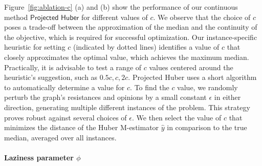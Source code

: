 \label{sec:find-c}




 

Figure~\ref{fig:ablation-c} (a) and (b) show
the performance of our continuous
method $\textsf{Projected Huber}$ for
different values of $c$.
We observe that the choice
of $c$ poses a trade-off between
the approximation of the median and 
the continuity of the objective,
which is required for successful
optimization. Our instance-specific heuristic for setting $c$ (indicated by dotted lines) identifies a value of $c$ that closely approximates the optimal value, which achieves the maximum median. Practically, it is advisable to test a range of $c$ values centered around the heuristic's suggestion, such as $0.5c, c, 2c$. %
%
%
\textsf{Projected Huber} uses a short algorithm to automatically determine a value for $c$. To find the $c$ value, we randomly perturb the graph's resistances and opinions by a small constant $\epsilon$ in either
direction, generating multiple different instances of the problem. This strategy proves robust against several choices of $\epsilon$. We then select the value of $c$ that minimizes the distance of the Huber M-estimator $\hat y$ in comparison to the true median, averaged over all instances. 




\paragraph{Laziness parameter $\phi$}

